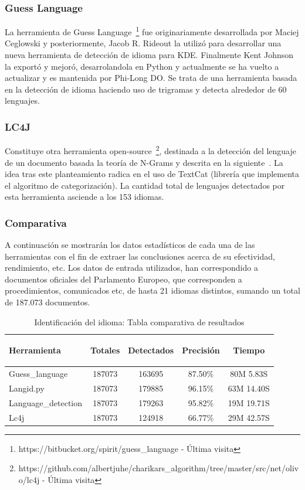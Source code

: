 \documentclass[runningheads,a4paper]{llncs}
\theoremstyle{break}
\newcommand{\rowstyle}[1]{\gdef\currentrowstyle{#1}%
  #1\ignorespaces
}
\begin{document}
\subsubsection{Guess Language}
\textbf{}

La herramienta de Guess Language~\footnote{https://bitbucket.org/spirit/guess\_language - Última visita} fue originariamente desarrollada por Maciej Ceglowski y posteriormente, Jacob R. Rideout la utilizó para desarrollar una nueva herramienta de detección de idioma para KDE. Finalmente Kent Johnson la exportó y mejoró, desarrolandola en Python y actualmente se ha vuelto a actualizar y es mantenida por Phi-Long DO. Se trata de una herramienta basada en la detección de idioma haciendo uso de trigramas y detecta alrededor de 60 lenguajes.

\subsubsection{LC4J}
\textbf{}

Constituye otra herramienta open-source~\footnote{https://github.com/albertjuhe/charikars\_algorithm/tree/master/src/net/olivo/lc4j - Última visita}, destinada a la detección del lenguaje de un documento basada la teoría de N-Grams y descrita en la siguiente~\cite{experiments:1}. La idea tras este planteamiento radica en el uso de TextCat (librería que implementa el algoritmo de categorización). La cantidad total de lenguajes detectados por esta herramienta asciende a los 153 idiomas. 

\subsubsection{Comparativa}
\textbf{}

A continuación se mostrarán los datos estadísticos de cada una de las herramientas con el fin de extraer las conclusiones acerca de su efectividad, rendimiento, etc. Los datos de entrada utilizados, han correspondido a documentos oficiales del Parlamento Europeo, que corresponden a procedimientos, comunicados etc, de hasta 21 idiomas distintos, sumando un total de 187.073 documentos.

\bgroup
\setlength{\tabcolsep}{12pt}
\def\arraystretch{1.5}
\begin{table}
\begin{tabular}{l|c|c|c|c}
\rowstyle{\bfseries}
Herramienta & \rowstyle{\bfseries} Totales & \rowstyle{\bfseries} Detectados & \rowstyle{\bfseries} Precisión & \rowstyle{\bfseries} Tiempo\\ \hline
Guess\_language     & 187073 & 163695 & 87.50\% & 80M 5.83S  \\
Langid.py	        & 187073 & 179885 & 96.15\% & 63M 14.40S\\
Language\_detection & 187073 & 179263 & 95.82\%	& 19M 19.71S\\
Lc4j		        & 187073 & 124918 & 66.77\% & 29M 42.57S\\ \hline
\end{tabular}
\vspace{1em}
\caption{Identificación del idioma: Tabla comparativa de resultados}
\end{table}
\egroup
\end{document}
